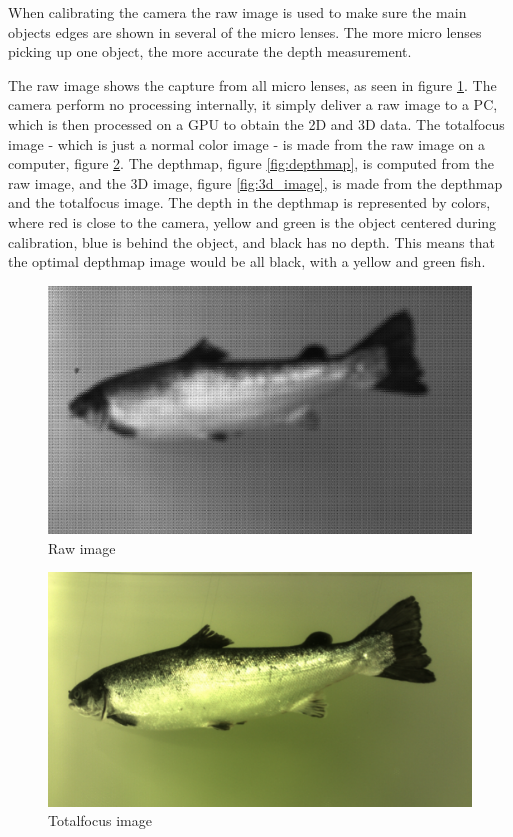 When calibrating the camera the raw image is used to make sure the main objects edges are shown in several of the micro lenses. The more micro lenses picking up one object, the more accurate the depth measurement. 

The raw image shows the capture from all micro lenses, as seen in figure \ref{fig:raw_image}. The camera perform no processing internally, it simply deliver a raw image to a PC, which is then processed on a GPU to obtain the 2D and 3D data. 
The totalfocus image - which is just a normal color image - is made from the raw image on a computer, figure \ref{fig:totalfocus}. 
The depthmap, figure \ref{fig:depthmap}, is computed from the raw image, and the 3D image, figure \ref{fig:3d_image}, is made from the depthmap and the totalfocus image. 
The depth in the depthmap is represented by colors, where red is close to the camera, yellow and green is the object centered during calibration, blue is behind the object, and black has no depth. This means that the optimal depthmap image would be all black, with a yellow and green fish.

\begin{figure}[h]
    \centering
    \includegraphics[width=.9\linewidth]{images/introduction/raw}
    \caption{Raw image}
    \label{fig:raw_image}
\end{figure}

\begin{figure}[h]
    \centering
    \includegraphics[width=.9\linewidth]{images/introduction/totalfocus}
    \caption{Totalfocus image}
    \label{fig:totalfocus}
\end{figure}

